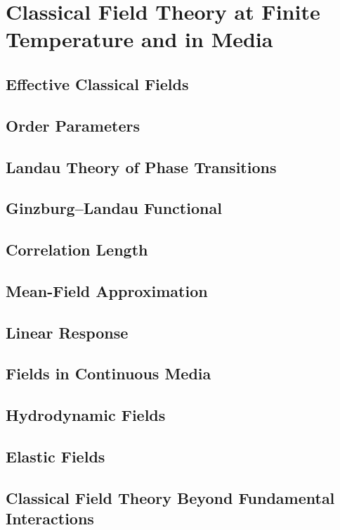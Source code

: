 \chapter{Classical Field Theory at Finite Temperature and in Media}

\section{Effective Classical Fields}
\section{Order Parameters}
\section{Landau Theory of Phase Transitions}
\section{Ginzburg--Landau Functional}
\section{Correlation Length}
\section{Mean-Field Approximation}
\section{Linear Response}
\section{Fields in Continuous Media}
\section{Hydrodynamic Fields}
\section{Elastic Fields}
\section{Classical Field Theory Beyond Fundamental Interactions}
